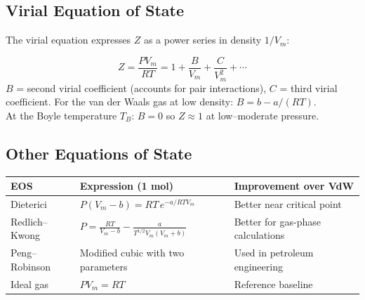 \documentclass[12pt,a4paper]{article}
\begin{document}
\begin{tcolorbox}[tikzbox, title={Compressibility Factor vs Pressure for Real Gases}]
\centering
{}
\end{tcolorbox}

\subsection{Virial Equation of State}
The virial equation expresses $Z$ as a power series in density $1/V_m$:

\begin{tcolorbox}[formulabox, title={Virial Equation of State}]
\[
Z = \frac{PV_m}{RT} = 1 + \frac{B}{V_m} + \frac{C}{V_m^2} + \cdots
\]
$B$ = second virial coefficient (accounts for pair interactions), $C$ = third virial coefficient. For the van der Waals gas at low density: $B = b - a/(RT)$.\\
At the Boyle temperature $T_B$: $B = 0$ so $Z \approx 1$ at low--moderate pressure.
\end{tcolorbox}

\subsection{Other Equations of State}

\begin{tabularx}{\linewidth}{|B{2.6cm}|Y|Y|}
\hline
\textbf{EOS} & \textbf{Expression (1 mol)} & \textbf{Improvement over VdW} \\
\hline
Dieterici & $P(V_m-b)=RT\,e^{-a/RTV_m}$ & Better near critical point \\
\hline
Redlich--Kwong & $P=\displaystyle\frac{RT}{V_m-b}-\frac{a}{T^{1/2}V_m(V_m+b)}$ & Better for gas-phase calculations \\
\hline
Peng--Robinson & Modified cubic with two parameters & Used in petroleum engineering \\
\hline
Ideal gas & $PV_m = RT$ & Reference baseline \\
\hline
\end{tabularx}
\end{document}
